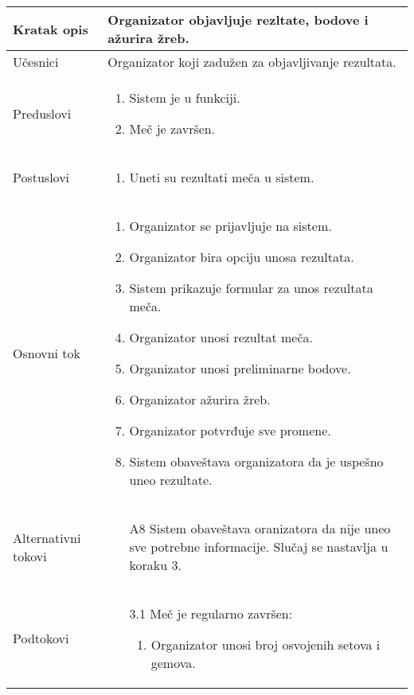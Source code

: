 \documentclass{article}
\begin{document}
\begin{longtable}{| p{} | p{} |} 
\hline
    Kratak opis & Organizator objavljuje rezltate, bodove i ažurira žreb.\\ 
\hline    
    Učesnici & 
         Organizator koji zadužen za objavljivanje rezultata.
    \\
\hline
   Preduslovi & \begin{enumerate}
       \item Sistem je u funkciji.
       \item Meč je završen.
   \end{enumerate}\\
\hline  
    Postuslovi & \begin{enumerate}
        \item Uneti su rezultati meča u sistem.
    \end{enumerate}\\
\hline
    Osnovni tok & \begin{enumerate}
        \item Organizator se prijavljuje na sistem.
        \item Organizator bira opciju unosa rezultata.
        \item Sistem prikazuje formular za unos rezultata meča.
        \item Organizator unosi rezultat meča.
        \item Organizator unosi preliminarne bodove.
        \item Organizator ažurira žreb.
        \item Organizator potvrđuje sve promene.
        \item Sistem obaveštava organizatora da je uspešno uneo rezultate.
    \end{enumerate}\\
\hline
    Alternativni tokovi &  \begin{enumerate}
    \item [A8] Sistem obaveštava oranizatora da nije uneo sve potrebne informacije. Slučaj se nastavlja u koraku 3.
    \end{enumerate}
    \\
\hline
    Podtokovi & \begin{enumerate}
        \item [3.1] Meč je regularno završen: \begin{enumerate}
                    \item Organizator unosi broj osvojenih setova i gemova.
                    \end{enumerate}

\end{enumerate}
\end{longtable}
\end{document}
